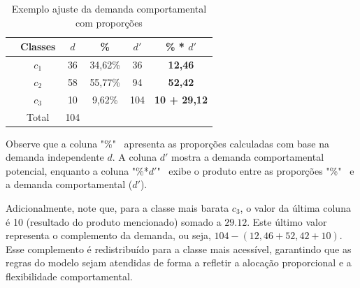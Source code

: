 \begin{table}[H]
    \centering
    \begin{tabular}{lccccc}
        \toprule
        & Classes & $d$ & \% & $d'$ & \textbf{\% * $d'$} \\
        \midrule
              & $c_1$ & 36 & 34,62\% & 36 & \textbf{12,46} \\
              & $c_2$ & 58 & 55,77\% & 94 & \textbf{52,42} \\
              & $c_3$ & 10 & 9,62\% & 104 & \textbf{10 + 29,12} \\
        \midrule
              & Total & 104 & & & \\
        \bottomrule
    \end{tabular}
    \caption{Exemplo ajuste da demanda comportamental com proporções}
	\label{tab: exemplo_ajuste_demanda}
\end{table}

Observe que a coluna "\%" \, apresenta as proporções calculadas com base na demanda independente $d$. A coluna $d'$ mostra a demanda comportamental potencial, enquanto a coluna "\%*$d'$" \, exibe o produto entre as proporções "\%" \, e a demanda comportamental ($d'$).

Adicionalmente, note que, para a classe mais barata $c_3$, o valor da última coluna é 10 (resultado do produto mencionado) somado a $29.12$. Este último valor representa o complemento da demanda, ou seja, $104-(12,46+52,42+10)$. Esse complemento é redistribuído para a classe mais acessível, garantindo que as regras do modelo sejam atendidas de forma a refletir a alocação proporcional e a flexibilidade comportamental.

